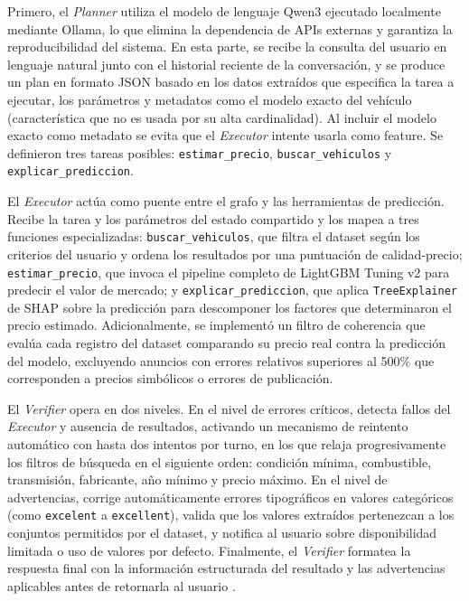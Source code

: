 \documentclass[conference]{IEEEtran}
\begin{document}
Primero, el \textit{Planner} utiliza el modelo de lenguaje Qwen3 ejecutado localmente mediante Ollama, lo que elimina la dependencia de APIs externas y garantiza la reproducibilidad del sistema. En esta parte, se recibe la consulta del usuario en lenguaje natural junto con el historial reciente de la conversación, y se produce un plan en formato JSON basado en los datos extraídos que especifica la tarea a ejecutar, los parámetros y metadatos como el modelo exacto del vehículo (característica que no es usada por su alta cardinalidad). Al incluir el modelo exacto como metadato se evita que el \textit{Executor} intente usarla como feature. Se definieron tres tareas posibles: \texttt{estimar\_precio}, \texttt{buscar\_vehiculos} y \texttt{explicar\_prediccion}.

El \textit{Executor} actúa como puente entre el grafo y las herramientas de predicción. Recibe la tarea y los parámetros del estado compartido y los mapea a tres funciones especializadas: \texttt{buscar\_vehiculos}, que filtra el dataset según los criterios del usuario y ordena los resultados por una puntuación de calidad-precio; \texttt{estimar\_precio}, que invoca el pipeline completo de LightGBM Tuning v2 para predecir el valor de mercado; y \texttt{explicar\_prediccion}, que aplica \texttt{TreeExplainer} de SHAP sobre la predicción para descomponer los factores que determinaron el precio estimado. Adicionalmente, se implementó un filtro de coherencia que evalúa cada registro del dataset comparando su precio real contra la predicción del modelo, excluyendo anuncios con errores relativos superiores al 500\% que corresponden a precios simbólicos o errores de publicación.

El \textit{Verifier} opera en dos niveles. En el nivel de errores críticos, detecta fallos del \textit{Executor} y ausencia de  resultados, activando un mecanismo de reintento automático con hasta dos intentos por turno, en los que relaja progresivamente los filtros de búsqueda en el siguiente orden: condición mínima, combustible, transmisión, fabricante, año mínimo y precio máximo. En el nivel de advertencias, corrige automáticamente errores tipográficos en valores categóricos (como \texttt{excelent} a \texttt{excellent}), valida que los valores extraídos pertenezcan a los conjuntos permitidos por el dataset, y notifica al usuario sobre disponibilidad limitada o uso de valores por defecto. Finalmente, el \textit{Verifier} formatea la respuesta final con la información estructurada del resultado y las advertencias aplicables antes de retornarla al usuario \cite{rosario2025}.
\end{document}
